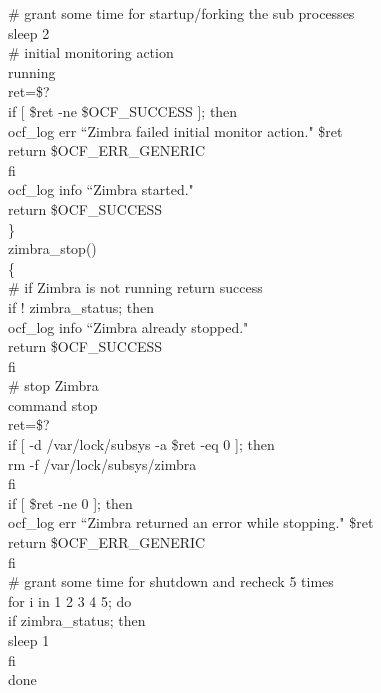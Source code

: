 \documentclass[a4paper, 12pt]{book}
\begin{document}
    \indent \# grant some time for startup/forking the sub processes\\
    \indent sleep 2\\

    \indent \# initial monitoring action\\
    \indent running\\
    \indent ret=\$?\\
    \indent if [ \$ret -ne \$OCF\_SUCCESS ]; then\\
     \indent \indent ocf\_log err ``Zimbra failed initial monitor action." \$ret\\
     \indent \indent return \$OCF\_ERR\_GENERIC\\
    \indent fi\\

    \indent ocf\_log info ``Zimbra started."\\
    \indent return \$OCF\_SUCCESS\\
\}\\


\noindent zimbra\_stop()\\
\{\\
    \indent \# if Zimbra is not running return success\\
    \indent if ! zimbra\_status; then\\
        \indent \indent ocf\_log info ``Zimbra already stopped."\\
        \indent \indent return \$OCF\_SUCCESS\\
    \indent fi\\

    \indent \# stop Zimbra\\
    \indent command stop \\
    \indent ret=\$?\\

    \indent if [ -d /var/lock/subsys -a \$ret -eq 0 ]; then\\
      \indent \indent rm -f /var/lock/subsys/zimbra\\
    \indent fi\\

    \indent if [ \$ret -ne 0 ]; then\\
        \indent \indent ocf\_log err ``Zimbra returned an error while stopping." \$ret\\
        \indent \indent return \$OCF\_ERR\_GENERIC\\
    \indent fi\\

    \indent \# grant some time for shutdown and recheck 5 times\\
    \indent for i in 1 2 3 4 5; do\\
        \indent \indent if zimbra\_status; then\\
            \indent \indent \indent sleep 1\\
        \indent \indent fi\\
    \indent done\\
\end{document}
